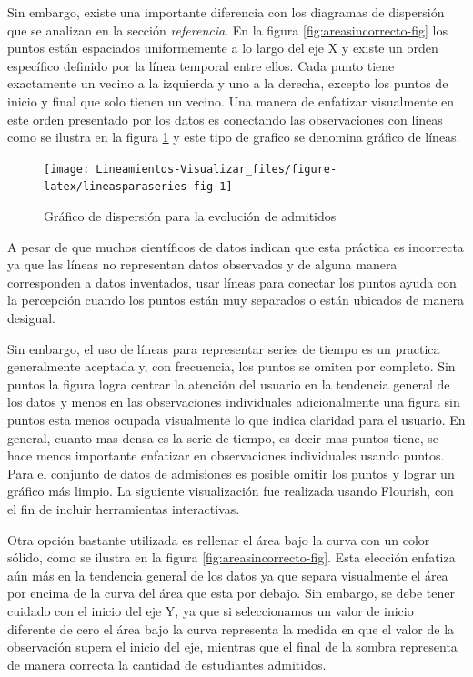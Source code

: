 \documentclass[
]{book}
\begin{document}
Sin embargo, existe una importante diferencia con los diagramas de dispersión que se analizan en la sección \emph{referencia}. En la figura \ref{fig:areasincorrecto-fig} los puntos están espaciados uniformemente a lo largo del eje X y existe un orden específico definido por la línea temporal entre ellos. Cada punto tiene exactamente un vecino a la izquierda y uno a la derecha, excepto los puntos de inicio y final que solo tienen un vecino. Una manera de enfatizar visualmente en este orden presentado por los datos es conectando las observaciones con líneas como se ilustra en la figura \ref{fig:lineasparaseries-fig} y este tipo de grafico se denomina gráfico de líneas.

\begin{figure}

{\centering \texttt{[image: Lineamientos-Visualizar\_files/figure-latex/lineasparaseries-fig-1]} 

}

\caption{Gráfico de dispersión para la evolución de admitidos}\label{fig:lineasparaseries-fig}
\end{figure}

A pesar de que muchos científicos de datos indican que esta práctica es incorrecta ya que las líneas no representan datos observados y de alguna manera corresponden a datos inventados, usar líneas para conectar los puntos ayuda con la percepción cuando los puntos están muy separados o están ubicados de manera desigual.

Sin embargo, el uso de líneas para representar series de tiempo es un practica generalmente aceptada y, con frecuencia, los puntos se omiten por completo. Sin puntos la figura logra centrar la atención del usuario en la tendencia general de los datos y menos en las observaciones individuales adicionalmente una figura sin puntos esta menos ocupada visualmente lo que indica claridad para el usuario. En general, cuanto mas densa es la serie de tiempo, es decir mas puntos tiene, se hace menos importante enfatizar en observaciones individuales usando puntos. Para el conjunto de datos de admisiones es posible omitir los puntos y lograr un gráfico más limpio. La siguiente visualización fue realizada usando Flourish, con el fin de incluir herramientas interactivas.

Otra opción bastante utilizada es rellenar el área bajo la curva con un color sólido, como se ilustra en la figura \ref{fig:areasincorrecto-fig}. Esta elección enfatiza aún más en la tendencia general de los datos ya que separa visualmente el área por encima de la curva del área que esta por debajo. Sin embargo, se debe tener cuidado con el inicio del eje Y, ya que si seleccionamos un valor de inicio diferente de cero el área bajo la curva representa la medida en que el valor de la observación supera el inicio del eje, mientras que el final de la sombra representa de manera correcta la cantidad de estudiantes admitidos.
\end{document}
